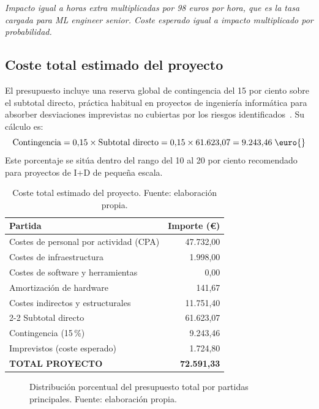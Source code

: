 \documentclass[11pt,a4paper]{article}
\begin{document}
\noindent\textit{\scriptsize Impacto igual a horas extra multiplicadas por 98 euros por hora, que es la tasa cargada para ML engineer senior. Coste esperado igual a impacto multiplicado por probabilidad.}

\subsection{Coste total estimado del proyecto}

El presupuesto incluye una reserva global de contingencia del 15 por ciento sobre el subtotal directo, práctica habitual en proyectos de ingeniería informática para absorber desviaciones imprevistas no cubiertas por los riesgos identificados~\cite{pmbok}. Su cálculo es:
\[
\text{Contingencia} = 0{,}15 \times \text{Subtotal directo} = 0{,}15 \times 61.623{,}07 = 9.243{,}46\;\text{\euro{}}
\]
Este porcentaje se sitúa dentro del rango del 10 al 20 por ciento recomendado para proyectos de I+D de pequeña escala.

\begin{table}[H]
\centering
\caption{Coste total estimado del proyecto. Fuente: elaboración propia.}
\label{tab:total}
\footnotesize
\begin{tabular}{l r}
\toprule
\textbf{Partida} & \textbf{Importe (\euro{})} \\
\midrule
Costes de personal por actividad (CPA)  & 47.732,00 \\
Costes de infraestructura               & 1.998,00  \\
Costes de software y herramientas       & 0,00      \\
Amortización de hardware                & 141,67    \\
Costes indirectos y estructurales       & 11.751,40 \\
\cmidrule{2-2}
Subtotal directo                        & 61.623,07 \\
Contingencia (15\,\%)                   & 9.243,46  \\
Imprevistos (coste esperado)            & 1.724,80  \\
\midrule
\textbf{TOTAL PROYECTO}                 & \textbf{72.591,33} \\
\bottomrule
\end{tabular}
\end{table}

\begin{figure}[H]
\centering
{}
\caption{Distribución porcentual del presupuesto total por partidas principales. Fuente: elaboración propia.}
\label{fig:distribucion-presupuesto}
\end{figure}
\end{document}
